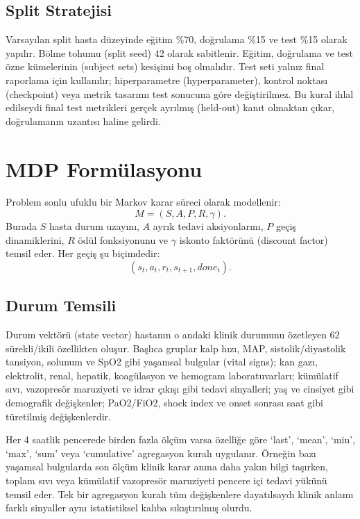 \documentclass[conference]{IEEEtran}
\begin{document}
\subsection{Split Stratejisi}
Varsayılan split hasta düzeyinde eğitim \%70, doğrulama \%15 ve test \%15 olarak yapılır. Bölme tohumu (split seed) 42 olarak sabitlenir. Eğitim, doğrulama ve test özne kümelerinin (subject sets) kesişimi boş olmalıdır. Test seti yalnız final raporlama için kullanılır; hiperparametre (hyperparameter), kontrol noktası (checkpoint) veya metrik tasarımı test sonucuna göre değiştirilmez. Bu kural ihlal edilseydi final test metrikleri gerçek ayrılmış (held-out) kanıt olmaktan çıkar, doğrulamanın uzantısı haline gelirdi.

\section{MDP Formülasyonu}
Problem sonlu ufuklu bir Markov karar süreci olarak modellenir:
\begin{equation}
M=(S,A,P,R,\gamma).
\end{equation}
Burada $S$ hasta durum uzayını, $A$ ayrık tedavi aksiyonlarını, $P$ geçiş dinamiklerini, $R$ ödül fonksiyonunu ve $\gamma$ iskonto faktörünü (discount factor) temsil eder. Her geçiş şu biçimdedir:
\begin{equation}
(s_t,a_t,r_t,s_{t+1},done_t).
\end{equation}

\subsection{Durum Temsili}
Durum vektörü (state vector) hastanın o andaki klinik durumunu özetleyen 62 sürekli/ikili özellikten oluşur. Başlıca gruplar kalp hızı, MAP, sistolik/diyastolik tansiyon, solunum ve SpO2 gibi yaşamsal bulgular (vital signs); kan gazı, elektrolit, renal, hepatik, koagülasyon ve hemogram laboratuvarları; kümülatif sıvı, vazopresör maruziyeti ve idrar çıkışı gibi tedavi sinyalleri; yaş ve cinsiyet gibi demografik değişkenler; PaO2/FiO2, shock index ve onset sonrası saat gibi türetilmiş değişkenlerdir.

Her 4 saatlik pencerede birden fazla ölçüm varsa özelliğe göre `last', `mean', `min', `max', `sum' veya `cumulative' agregasyon kuralı uygulanır. Örneğin bazı yaşamsal bulgularda son ölçüm klinik karar anına daha yakın bilgi taşırken, toplam sıvı veya kümülatif vazopresör maruziyeti pencere içi tedavi yükünü temsil eder. Tek bir agregasyon kuralı tüm değişkenlere dayatılsaydı klinik anlamı farklı sinyaller aynı istatistiksel kalıba sıkıştırılmış olurdu.
\end{document}
